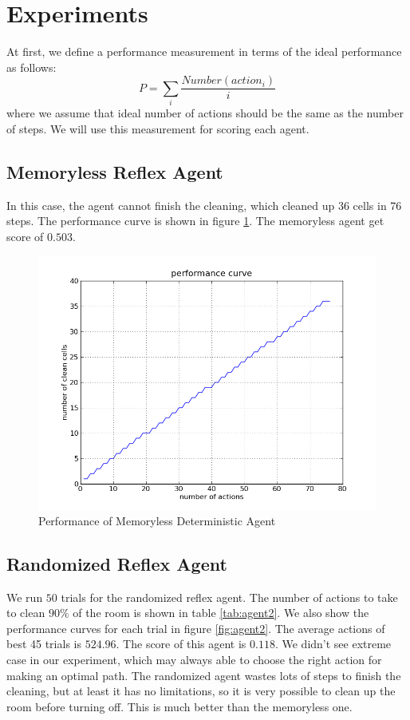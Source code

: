 \section{Experiments}
At first, we define a performance measurement in terms of the ideal performance as follows:
\[
P = \sum_i \frac{Number(action_i)}{i}
\]
where we assume that ideal number of actions should be the same as the number of steps. We will use this measurement for scoring each agent.

\subsection{Memoryless Reflex Agent}
In this case, the agent cannot finish the cleaning, which cleaned up $36$ cells in 76 steps. The performance curve is shown in figure \ref{fig:agent1}. The memoryless agent get score of $0.503$.

\begin{figure}[!h]
\centering
\includegraphics[scale=.35]{img/agent1.png}
\caption{Performance of Memoryless Deterministic Agent}
\label{fig:agent1}
\end{figure}

\subsection{Randomized Reflex Agent}
We run $50$ trials for the randomized reflex agent. The number of actions to take to clean $90\%$ of the room is shown in table \ref{tab:agent2}. We also show the performance curves for each trial in figure \ref{fig:agent2}. The average actions of best 45 trials is $524.96$. The score of this agent is $0.118$. We didn't see extreme case in our experiment, which may always able to choose the right action for making an optimal path. The randomized agent wastes lots of steps to finish the cleaning, but at least it has no limitations, so it is very possible to clean up the room before turning off. This is much better than the memoryless one.

